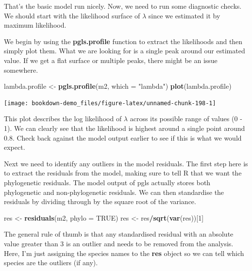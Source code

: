 \documentclass[
]{book}
\newenvironment{Shaded}{\begin{snugshade}}{\end{snugshade}}
\newcommand{\DataTypeTok}[1]{\textcolor[rgb]{0.13,0.29,0.53}{#1}}
\newcommand{\DecValTok}[1]{\textcolor[rgb]{0.00,0.00,0.81}{#1}}
\newcommand{\KeywordTok}[1]{\textcolor[rgb]{0.13,0.29,0.53}{\textbf{#1}}}
\newcommand{\NormalTok}[1]{#1}
\newcommand{\OperatorTok}[1]{\textcolor[rgb]{0.81,0.36,0.00}{\textbf{#1}}}
\newcommand{\OtherTok}[1]{\textcolor[rgb]{0.56,0.35,0.01}{#1}}
\newcommand{\StringTok}[1]{\textcolor[rgb]{0.31,0.60,0.02}{#1}}
\begin{document}
That's the basic model run nicely. Now, we need to run some diagnostic checks. We should start with the likelihood surface of \(\lambda\) since we estimated it by maximum likelihood.

We begin by using the \textbf{pgls.profile} function to extract the likelihoods and then simply plot them. What we are looking for is a single peak around our estimated value. If we get a flat surface or multiple peaks, there might be an issue somewhere.

\begin{Shaded}
\begin{Highlighting}[]
\NormalTok{lambda.profile \textless{}{-}}\StringTok{ }\KeywordTok{pgls.profile}\NormalTok{(m2, }\DataTypeTok{which =} \StringTok{"lambda"}\NormalTok{)}
\KeywordTok{plot}\NormalTok{(lambda.profile)}
\end{Highlighting}
\end{Shaded}

\begin{center}\texttt{[image: bookdown-demo\_files/figure-latex/unnamed-chunk-198-1]} \end{center}

This plot describes the log likelihood of \(\lambda\) across its possible range of values (0 - 1). We can clearly see that the likelihood is highest around a single point around 0.8. Check back against the model output earlier to see if this is what we would expect.

Next we need to identify any outliers in the model residuals. The first step here is to extract the residuals from the model, making sure to tell R that we want the phylogenetic residuals. The model output of pgls actually stores both phylogenetic and non-phylogenetic residuals. We can then standardise the residuals by dividing through by the square root of the variance.

\begin{Shaded}
\begin{Highlighting}[]
\NormalTok{res \textless{}{-}}\StringTok{ }\KeywordTok{residuals}\NormalTok{(m2, }\DataTypeTok{phylo =} \OtherTok{TRUE}\NormalTok{)}
\NormalTok{res \textless{}{-}}\StringTok{ }\NormalTok{res}\OperatorTok{/}\KeywordTok{sqrt}\NormalTok{(}\KeywordTok{var}\NormalTok{(res))[}\DecValTok{1}\NormalTok{]}
\end{Highlighting}
\end{Shaded}

The general rule of thumb is that any standardised residual with an absolute value greater than 3 is an outlier and needs to be removed from the analysis. Here, I'm just assigning the species names to the \textbf{res} object so we can tell which species are the outliers (if any).
\end{document}
